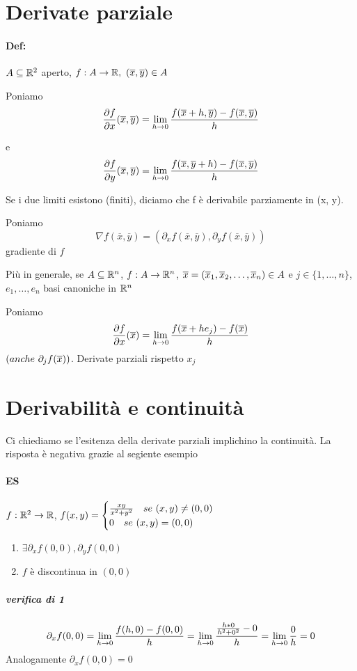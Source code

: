 \documentclass[a4paper]{article}
\begin{document}
\section{Derivate parziale}
\paragraph{Def:} $A \subseteq \mathbb{R} ^2$ aperto, $f: A \to \mathbb{R},\ (\overline x, \overline y) \in A$

Poniamo
$$
{ \partial f \over \partial x } (\overline x, \overline y) = \lim_{h \to 0} { f(\overline x+h, \overline y) - f(\overline x, \overline y) \over h } \\
$$

e
$$
{ \partial f \over \partial y } (\overline x, \overline y) = \lim_{h \to 0} { f(\overline x, \overline y +h) - f(\overline x, \overline y) \over h } \\
$$

Se i due limiti esistono (finiti), diciamo che f è derivabile parziamente in (\overline x, \overline y).

Poniamo
$$
\nabla f(\overline x, \overline y) = ( \partial_x f(\overline x, \overline y), \partial_y f(\overline x, \overline y))
$$
gradiente di $f$

Più in generale, se $A \subseteq \mathbb{R} ^n$, $f: A \to \mathbb{R} ^n$, $\overline{x} = (\overline{x}_1, \overline{x}_2, \dots, \overline{x}_n) \in A$ e $j \in \{1, \dots, n\}$, $e_1, \dots, e_n$ basi canoniche in $\mathbb{R} ^n$

Poniamo
$$
{ \partial f \over \partial x }(\overline{x}) = \lim_{h \to 0} { f( \overline{x} + h e_j) - f(\overline{x}) \over h} \\
$$
$(anche\ \partial_j f(\overline{x}))$. Derivate parziali rispetto $x_j$

\section{Derivabilità e continuità}
Ci chiediamo se l'esitenza della derivate parziali implichino la continuità. La risposta è negativa grazie al segiente esempio
\paragraph{ES} $f: \mathbb{R} ^ 2 \to \mathbb{R}$, $ f(x,y)= \begin{cases} { xy \over x^2 +y^2} \quad se\ (x,y) \neq (0,0) \\ 0 \quad se\ (x,y) = (0,0) \end{cases}$
	\begin{enumerate}
		\item $ \exists \partial_x f(0,0), \partial_y f(0,0) $
		\item $f$ è discontinua in $(0,0)$
	\end{enumerate}
\subparagraph{verifica di 1}
$$
\partial_x f(0,0) = \lim_{h \to 0} {f(h,0) -f(0,0) \over h} = \lim_{h \to 0} { {h*0 \over h^2 + 0^2} - 0 \over h} = \lim_{h \to 0} {0 \over h} = 0
$$
Analogamente $\partial_x f(0,0) = 0$
\end{document}
